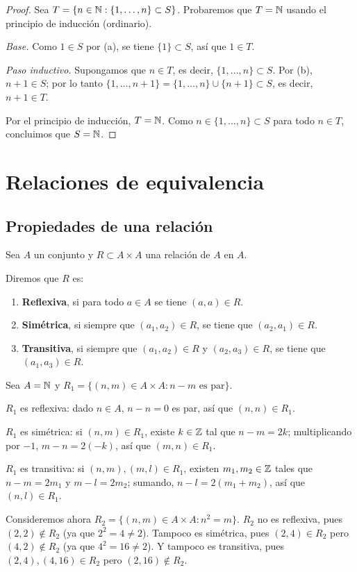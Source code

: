 \documentclass[12pt,a4paper]{book}
\begin{document}
    \begin{proof}
        Sea $T=\{n\in\mathbb{N} : \{1,\dots,n\}\subset S\}$. Probaremos que $T=\mathbb{N}$ usando el principio de inducción (ordinario).

        \emph{Base.} Como $1\in S$ por (a), se tiene $\{1\}\subset S$, así que $1\in T$.

        \emph{Paso inductivo.} Supongamos que $n\in T$, es decir, $\{1,\dots,n\}\subset S$. Por (b), $n+1\in S$; por lo tanto $\{1,\dots,n+1\} = \{1,\dots,n\}\cup\{n+1\}\subset S$, es decir, $n+1\in T$.

        Por el principio de inducción, $T=\mathbb{N}$. Como $n\in\{1,\dots,n\}\subset S$ para todo $n\in T$, concluimos que $S=\mathbb{N}$.
    \end{proof}

    \chapter{Relaciones de equivalencia}

    \section{Propiedades de una relación}

    Sea $A$ un conjunto y $R\subset A\times A$ una relación de $A$ en $A$.

    \begin{definicion}
        Diremos que $R$ es:
        \begin{enumerate}[label=(\alph*)]
            \item \textbf{Reflexiva}, si para todo $a\in A$ se tiene $(a,a)\in R$.
            \item \textbf{Simétrica}, si siempre que $(a_1,a_2)\in R$, se tiene que $(a_2,a_1)\in R$.
            \item \textbf{Transitiva}, si siempre que $(a_1,a_2)\in R$ y $(a_2,a_3)\in R$, se tiene que $(a_1,a_3)\in R$.
        \end{enumerate}
    \end{definicion}

    \begin{ejemplo}
        Sea $A=\mathbb{N}$ y $R_1 = \{(n,m)\in A\times A : n-m \text{ es par}\}$.

        $R_1$ es reflexiva: dado $n\in A$, $n-n=0$ es par, así que $(n,n)\in R_1$.

        $R_1$ es simétrica: si $(n,m)\in R_1$, existe $k\in\mathbb{Z}$ tal que $n-m=2k$; multiplicando por $-1$, $m-n=2(-k)$, así que $(m,n)\in R_1$.

        $R_1$ es transitiva: si $(n,m),(m,l)\in R_1$, existen $m_1,m_2\in\mathbb{Z}$ tales que $n-m=2m_1$ y $m-l=2m_2$; sumando, $n-l = 2(m_1+m_2)$, así que $(n,l)\in R_1$.

        Consideremos ahora $R_2 = \{(n,m)\in A\times A : n^2=m\}$. $R_2$ no es reflexiva, pues $(2,2)\notin R_2$ (ya que $2^2=4\neq 2$). Tampoco es simétrica, pues $(2,4)\in R_2$ pero $(4,2)\notin R_2$ (ya que $4^2=16\neq 2$). Y tampoco es transitiva, pues $(2,4),(4,16)\in R_2$ pero $(2,16)\notin R_2$.
    \end{ejemplo}
\end{document}
